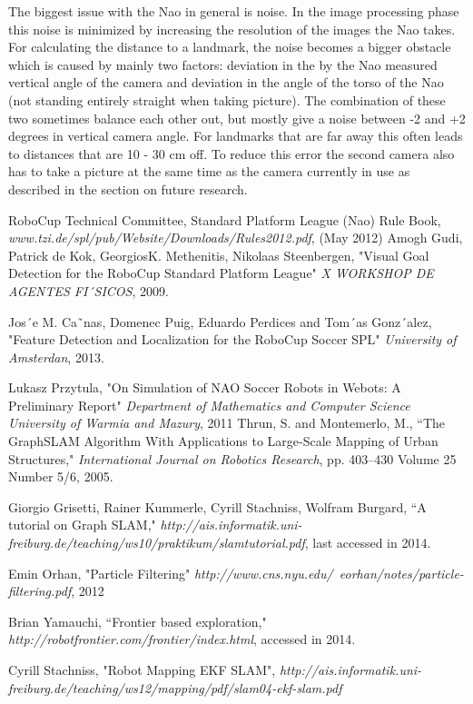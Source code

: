 \documentclass{ba-kecs}
\numberwithin{figure}{section}
\numberwithin{equation}{section}
\begin{document}
The biggest issue with the Nao in general is noise. In the image processing phase this noise is minimized by increasing the resolution of the images the Nao takes. For calculating the distance to a landmark, the noise becomes a bigger obstacle which is caused by mainly two factors: deviation in the by the Nao measured vertical angle of the camera and deviation in the angle of the torso of the Nao (not standing entirely straight when taking picture).
The combination of these two sometimes balance each other out, but mostly give a noise between -2 and +2 degrees in vertical camera angle. For landmarks that are far away this often leads to distances that are 10 - 30 cm off. To reduce this error the second camera also has to take a picture at the same time as the camera currently in use as described in the section on future research. 




\begin{thebibliography}{99}

 RoboCup Technical Committee, Standard Platform League (Nao) Rule Book, \emph{www.tzi.de/spl/pub/Website/Downloads/Rules2012.pdf}, (May 2012)
 Amogh Gudi, Patrick de Kok, GeorgiosK. Methenitis, Nikolaas Steenbergen, "Visual Goal Detection for the RoboCup Standard Platform League" \emph{X WORKSHOP DE AGENTES FI´SICOS}, 2009.

 Jos´e M. Ca˜nas, Domenec Puig, Eduardo Perdices and Tom´as Gonz´alez, "Feature Detection and Localization for the
RoboCup Soccer SPL" \emph{University of Amsterdan}, 2013.

 Lukasz Przytula, "On Simulation of NAO Soccer Robots in Webots: A Preliminary Report" \emph{Department of Mathematics and Computer Science University of Warmia and Mazury}, 2011
 Thrun, S. and Montemerlo, M., ``The GraphSLAM Algorithm With Applications to Large-Scale Mapping of Urban Structures," \emph{International Journal on Robotics Research}, pp. 403--430 Volume 25 Number 5/6, 2005.

 Giorgio Grisetti, Rainer Kummerle, Cyrill Stachniss, Wolfram Burgard, ``A tutorial on Graph SLAM," \emph{http://ais.informatik.uni-freiburg.de/teaching/ws10/praktikum/slamtutorial.pdf}, last accessed in 2014.

 Emin Orhan, "Particle Filtering" \emph{http://www.cns.nyu.edu/~eorhan/notes/particle-filtering.pdf}, 2012
 
 Brian Yamauchi, ``Frontier based exploration," \emph{http://robotfrontier.com/frontier/index.html}, accessed in 2014. 

 Cyrill Stachniss, "Robot Mapping EKF SLAM", \emph{http://ais.informatik.uni-freiburg.de/teaching/ws12/mapping/pdf/slam04-ekf-slam.pdf }


\end{thebibliography}
\end{document}
